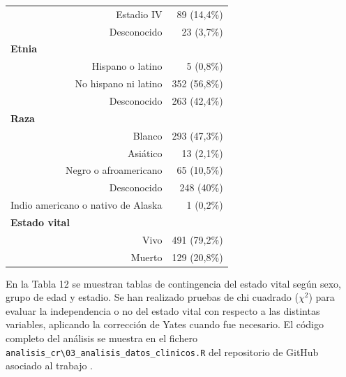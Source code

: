 \begin{table}[H]
\begin{tabular}{rr}
		Estadio IV                                 & 89 (14,4\%)                                               \\
		Desconocido                                & 23 (3,7\%)                                                \\ \hline
		\multicolumn{1}{l}{\textbf{Etnia}}         &                                                           \\
		Hispano o latino                           & 5 (0,8\%)                                                 \\
		No hispano ni latino                       & 352 (56,8\%)                                              \\
		Desconocido                                & 263 (42,4\%)                                              \\ \hline
		\multicolumn{1}{l}{\textbf{Raza}}          &                                                           \\
		Blanco                                     & 293 (47,3\%)                                              \\
		Asiático                                   & 13 (2,1\%)                                                \\
		Negro o afroamericano                      & 65 (10,5\%)                                               \\
		Desconocido                                & 248 (40\%)                                                \\
		Indio americano o nativo de Alaska         & 1 (0,2\%)                                                 \\ \hline
		\multicolumn{1}{l}{\textbf{Estado vital}}  &                                                           \\
		Vivo                                       & 491 (79,2\%)                                              \\
		Muerto                                     & 129 (20,8\%)                                              \\ \hline
	\end{tabular}
\end{table}

En la Tabla 12 se muestran tablas de contingencia del estado vital según sexo, grupo de edad y estadio. Se han realizado pruebas de chi cuadrado ($\chi^2$) \cite{Pearson1900} para evaluar la independencia o no del estado vital con respecto a las distintas variables, aplicando la corrección de Yates \cite{Yates1934} cuando fue necesario. El código completo del análisis se muestra en el fichero \texttt{analisis\_cr\textbackslash03\_analisis\_datos\_clinicos.R} del repositorio de GitHub asociado al trabajo \cite{Redondo-Sanchez2020}.\\

